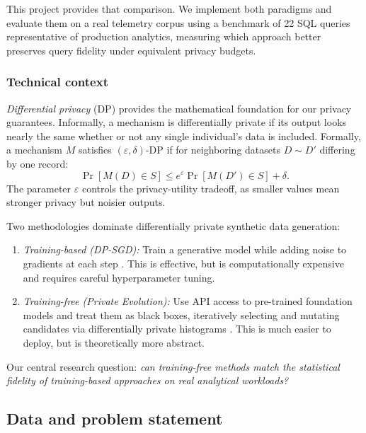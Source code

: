\documentclass[12pt,letterpaper]{article}
\renewcommand{\_}{\textunderscore\allowbreak}
\begin{document}
This project provides that comparison. We implement both paradigms and evaluate them on a real telemetry corpus using a benchmark of 22 SQL queries representative of production analytics, measuring which approach better preserves query fidelity under equivalent privacy budgets.

\subsubsection{Technical context}

\textit{Differential privacy} (DP) provides the mathematical foundation for our privacy guarantees. Informally, a mechanism is differentially private if its output looks nearly the same whether or not any single individual's data is included. Formally, a mechanism $M$ satisfies $(\varepsilon, \delta)$-DP if for neighboring datasets $D \sim D'$ differing by one record:
\begin{equation}
    \Pr[M(D) \in S] \leq e^{\varepsilon} \Pr[M(D') \in S] + \delta.
\end{equation}
The parameter $\varepsilon$ controls the privacy-utility tradeoff, as smaller values mean stronger privacy but noisier outputs.

Two methodologies dominate differentially private synthetic data generation:

\begin{enumerate}
    \item \textit{Training-based (DP-SGD):} Train a generative model while adding noise to gradients at each step \citep{abadi2016deep}. This is effective, but is computationally expensive and requires careful hyperparameter tuning.
    
    \item \textit{Training-free (Private Evolution):} Use API access to pre-trained foundation models and treat them as black boxes, iteratively selecting and mutating candidates via differentially private histograms \citep{lin2025differentiallyprivatesyntheticdata}. This is much easier to deploy, but is theoretically more abstract.
\end{enumerate}

Our central research question: \textit{can training-free methods match the statistical fidelity of training-based approaches on real analytical workloads?}

\newpage

\subsection{Data and problem statement}
\end{document}
